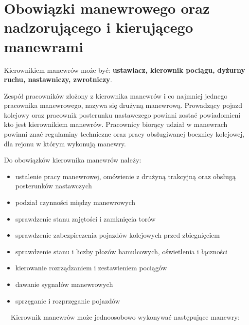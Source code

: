 \chapter{Obowiązki manewrowego oraz nadzorującego i kierującego manewrami}

Kierownikiem manewrów może być: \textbf{ustawiacz, kierownik pociągu, dyżurny ruchu, nastawniczy, zwrotniczy}. 

Zespół pracowników zlożony z kierownika manewrów i co najmniej jednego pracownika manewrowego,  nazywa się drużyną
manewrową. Prowadzący pojazd kolejowy oraz pracownik posterunku nastawczego powinni zostać powiadomieni kto jest
kierownikiem manewrów. Pracownicy biorący udział w manewrach powinni znać regulaminy techniczne oraz pracy obsługiwanej
bocznicy kolejowej, dla rejonu w którym wykonują manewry.

Do obowiązków kierownika manewrów należy:

\begin{itemize}
\item ustalenie pracy manewrowej, omówienie z drużyną trakcyjną oraz obsługą posterunków nastawczych
\item podział czynności między manewrowych
\item sprawdzenie stanu zajętości i zamknięcia torów
\item sprawdzenie zabezpieczenia pojazdów kolejowych przed zbiegnięciem
\item sprawdzenie stanu i liczby płozów hamulcowych, oświetlenia i łączności
\item kierowanie rozrządzaniem i zestawieniem pociągów
\item dawanie sygnałów manewrowych
\item sprzęganie i rozprzęganie pojazdów
\end{itemize}
\ \ Kierownik manewrów może jednoosobowo wykonywać następujące manewry:

